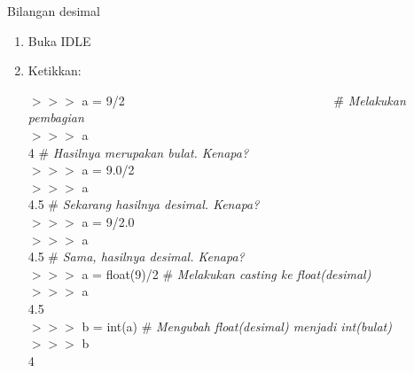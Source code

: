 \begin{panduan}{Bilangan desimal}
\begin{enumerate}
	\item Buka IDLE
	\item Ketikkan:
	\begin{IDLE}
		\begin{tabbing}
			$>>>$ a = 9/2~~~~~~~~~~~~~~~~~~~~~~~~~~~~~~~~~ \= \# \textit{Melakukan pembagian}\\
			$>>>$ a \\
			4 \> \# \textit{Hasilnya merupakan bulat. Kenapa?}\\
			$>>>$  a = 9.0/2 \\
			$>>>$ a \\
			4.5 \> \# \textit{Sekarang hasilnya desimal. Kenapa?}\\
			$>>>$ a = 9/2.0 \\
			$>>>$ a \\
			4.5 \> \# \textit{Sama, hasilnya desimal. Kenapa?}\\
			$>>>$ a = float(9)/2 \> \# \textit{Melakukan casting ke float(desimal)}\\
			$>>>$ a \\
			4.5 \\
			$>>>$ b = int(a) \> \# \textit{Mengubah float(desimal) menjadi int(bulat)}\\
			$>>>$ b \\
			4\\ 
		\end{tabbing}
	\end{IDLE}
\end{enumerate}
\end{panduan}

